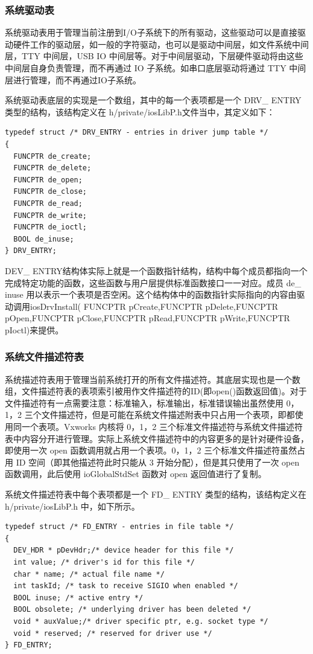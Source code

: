 \subsubsection{系统驱动表}	
	系统驱动表用于管理当前注册到I/O子系统下的所有驱动，这些驱动可以是直接驱动硬件工作的驱动层，如一般的字符驱动，也可以是驱动中间层，如文件系统中间层，TTY 中间层，USB IO 中间层等。对于中间层驱动，下层硬件驱动将由这些中间层自身负责管理，而不再通过 IO 子系统。如串口底层驱动将通过 TTY 中间层进行管理，而不再通过IO子系统\cite{曹桂平2011VxWorks}\cite{罗国庆2003VxWorks}。
	
	系统驱动表底层的实现是一个数组，其中的每一个表项都是一个 DRV\_ ENTRY 类型的结构，该结构定义在 h/private/iosLibP.h文件当中，其定义如下：
\lstset{language=C}
\begin{lstlisting}
typedef struct /* DRV_ENTRY - entries in driver jump table */ 
{ 
  FUNCPTR de_create; 
  FUNCPTR de_delete; 
  FUNCPTR de_open; 
  FUNCPTR de_close; 
  FUNCPTR de_read; 
  FUNCPTR de_write; 
  FUNCPTR de_ioctl; 
  BOOL de_inuse; 
} DRV_ENTRY; 
\end{lstlisting}
DEV\_ ENTRY结构体实际上就是一个函数指针结构，结构中每个成员都指向一个完成特定功能的函数，这些函数与用户层提供标准函数接口一一对应\cite{VxWorksDriverAPI}\cite{Wind2003VxWorks}。成员 de\_ inuse 用以表示一个表项是否空闲。这个结构体中的函数指针实际指向的内容由驱动调用iosDrvInstall( FUNCPTR pCreate,FUNCPTR pDelete,FUNCPTR pOpen,FUNCPTR pClose,FUNCPTR pRead,FUNCPTR pWrite,FUNCPTR pIoctl)来提供。 


\subsubsection{系统文件描述符表}
	系统描述符表用于管理当前系统打开的所有文件描述符。其底层实现也是一个数组，文件描述符表的表项索引被用作文件描述符的ID(即open()函数返回值)。对于文件描述符有一点需要注意：标准输入，标准输出，标准错误输出虽然使用 0，1，2 三个文件描述符，但是可能在系统文件描述附表中只占用一个表项，即都使用同一个表项\cite{基于VxWorks的嵌入式实时系统设计}\cite{曹桂平2011VxWorks}。Vxworks 内核将 0，1，2 三个标准文件描述符与系统文件描述符表中内容分开进行管理。实际上系统文件描述符中的内容更多的是针对硬件设备，即使用一次 open 函数调用就占用一个表项。0，1，2 三个标准文件描述符虽然占用 ID 空间（即其他描述符此时只能从 3 开始分配），但是其只使用了一次 open 函数调用，此后使用 ioGlobalStdSet 函数对 open 返回值进行了复制\cite{嵌入式实时操作系统VxWorks及其开发环境Tornado}\cite{史小斌2003VxWorks}\cite{曹桂平2011VxWorks}。

系统文件描述符表中每个表项都是一个 FD\_ ENTRY 类型的结构，该结构定义在h/private/iosLibP.h 中，如下所示。
\lstset{language=C}
\begin{lstlisting}
typedef struct /* FD_ENTRY - entries in file table */ 
{ 
  DEV_HDR * pDevHdr;/* device header for this file */ 
  int value; /* driver's id for this file */ 
  char * name; /* actual file name */ 
  int taskId; /* task to receive SIGIO when enabled */ 
  BOOL inuse; /* active entry */ 
  BOOL obsolete; /* underlying driver has been deleted */ 
  void * auxValue;/* driver specific ptr, e.g. socket type */ 
  void * reserved; /* reserved for driver use */ 
} FD_ENTRY; 
\end{lstlisting}

